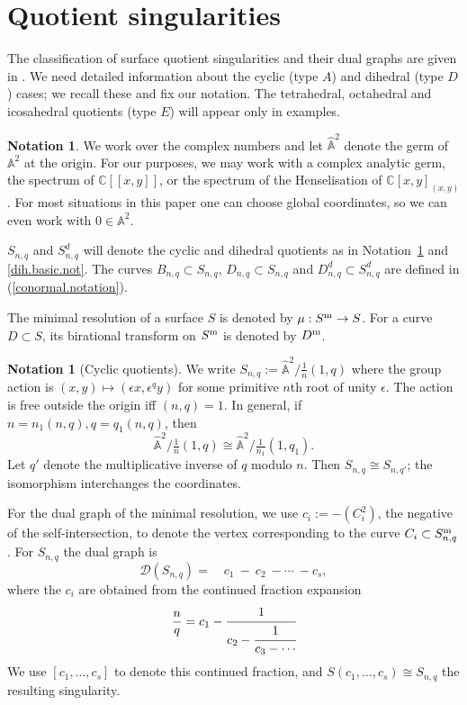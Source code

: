 \documentclass{amsart}
\theoremstyle{definition}
\newtheorem{notation}[thm]{Notation}
\theoremstyle{remark}
\renewcommand{\c}[0]{{\mathbb C}}
\renewcommand{\a}[0]{\hat{\mathbb A}}
\begin{document}
 

\section{Quotient singularities}


The classification of surface quotient singularities and  their dual graphs are given in \cite{briesk}.
We need detailed information about the cyclic (type $A$) and dihedral (type $D$) cases; we recall these and fix our notation.
The tetrahedral, octahedral and icosahedral quotients (type $E$) will appear only in examples.

\begin{notation}
We work over the complex numbers and let $\a^2$ denote the germ of ${\mathbb A}^2$ at the origin. For our purposes, we may work with a complex analytic germ,
the spectrum of $\c[[x,y]]$, or the  spectrum of the Henselisation of
$\c[x,y]_{(x,y)}$.
For most situations in this paper one can choose  global coordinates, so we can even work with   $0\in {\mathbb A}^2$.

$S_{n,q}$ and $S^d_{n,q}$ will denote the cyclic and dihedral
quotients as in Notation~\ref{cyclic.basic.not} and \ref{dih.basic.not}.
The curves  $B_{n,q}\subset S_{n,q}$, $D_{n,q}\subset S_{n,q}$ and $D^d_{n,q}\subset S^d_{n,q}$ are defined in (\ref{conormal.notation}).

The minimal resolution of a surface $S$ is denoted by $\mu:S^{\rm m}\to S$.
For a curve $D\subset S$, its birational transform on $S^{\rm m}$ is denoted by $D^{\rm m}$.
\end{notation}

\begin{notation}[Cyclic quotients]\label{cyclic.basic.not}
  We write $S_{n,q}:=\a^2/\frac1{n}(1,q)$
  where the group action is $(x, y)\mapsto (\epsilon x, \epsilon^q y)$
  for some primitive $n$th root of unity $\epsilon$. The action is free outside the origin iff $(n, q)=1$.   In general, if $n=n_1(n,q), q=q_1(n,q)$, then
  $$
  \a^2/\tfrac1{n}(1,q)\cong \a^2/\tfrac1{n_1}(1,q_1).
  $$
  Let $q'$ denote the multiplicative inverse of $q$  modulo $n$. Then
  $S_{n,q}\cong  S_{n,q'}$;  the isomorphism interchanges the coordinates.

  For the dual graph of the minimal resolution, we use $c_i:=-(C_i^2)$, the negative of the self-intersection, to denote the vertex corresponding to the curve $C_i\subset S_{n,q}^{\rm m}$.
   For $S_{n,q}$ the dual graph is
  $$
 {\mathcal D}(S_{n,q}) =\quad  c_1\ - \ c_2 \ - \cdots \  - c_s,
  $$
    where the $c_i$ are obtained from the continued fraction expansion
    $$
    \frac{n}{q}=c_1-\cfrac{1}{c_2-\cfrac{1}{c_3-\cdots}}
    $$
    We use $[c_1, \dots, c_s]$ to denote this continued fraction, and
    $S(c_1, \dots, c_s)\cong S_{n,q}$ the resulting singularity.
      \end{notation}
\end{document}
